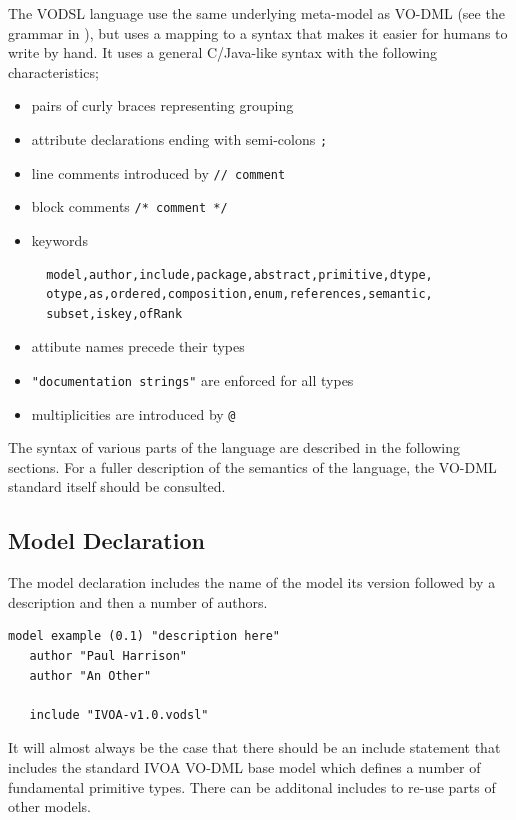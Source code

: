 \documentclass[11pt,a4paper]{ivoa}
\begin{document}
The VODSL language use the same underlying meta-model as VO-DML (see the grammar in \label{sec:grammar}), but uses a mapping to a syntax that makes it easier
for humans to write by hand. It uses a general C/Java-like syntax with the following characteristics;

\begin{itemize}
  \item pairs of curly braces representing grouping
  \item attribute declarations ending with semi-colons \lstinline{;}
  \item line comments introduced by \lstinline{// comment}
  \item block comments \lstinline{/* comment */}
  \item keywords \begin{lstlisting}
  model,author,include,package,abstract,primitive,dtype,
  otype,as,ordered,composition,enum,references,semantic,
  subset,iskey,ofRank
  \end{lstlisting}
  \item attibute names precede their types
  \item \lstinline{"documentation strings"} are enforced for all types
  \item multiplicities are introduced by \lstinline{@}
\end{itemize}

The syntax of various parts of the language are described in the following sections. For a fuller description of the 
semantics of the language, the VO-DML standard itself should be consulted.


\subsection{Model Declaration}
The model declaration includes the name of the model its version followed by a description and then a number of authors.
\begin{lstlisting}[language=vodsl]
 model example (0.1) "description here" 
   author "Paul Harrison"
   author "An Other"
   
   include "IVOA-v1.0.vodsl"

\end{lstlisting}

It will almost always be the case that there should be an include statement that includes the standard IVOA VO-DML base model which defines a 
number of fundamental primitive types. There can be additonal includes to re-use parts of other models.
\end{document}
